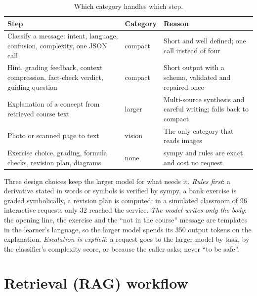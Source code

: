 \documentclass[11pt,a4paper]{article}
\begin{document}
\begin{table}[H]
\centering\small
\begin{tabularx}{\textwidth}{@{}p{5.6cm}p{2.3cm}Y@{}}
\toprule
\textbf{Step} & \textbf{Category} & \textbf{Reason} \\
\midrule
Classify a message: intent, language, confusion, complexity, one JSON call & compact & Short and well defined; one call instead of four \\
Hint, grading feedback, context compression, fact-check verdict, guiding question & compact & Short output with a schema, validated and repaired once \\
Explanation of a concept from retrieved course text & larger & Multi-source synthesis and careful writing; falls back to compact \\
Photo or scanned page to text & vision & The only category that reads images \\
Exercise choice, grading, formula checks, revision plan, diagrams & none & sympy and rules are exact and cost no request \\
\bottomrule
\end{tabularx}
\caption{Which category handles which step.}\label{tab:routing}
\end{table}
\vspace{-6pt}

Three design choices keep the larger model for what needs it. \emph{Rules first}: a derivative stated in words or
symbols is verified by sympy, a bank exercise is graded symbolically, a revision plan is computed; in a simulated
classroom of 96 interactive requests only 32 reached the service. \emph{The model writes only the body}: the opening
line, the exercise and the ``not in the course'' message are templates in the learner's language, so the larger model
spends its 350 output tokens on the explanation. \emph{Escalation is explicit}: a request goes to the larger model by
task, by the classifier's complexity score, or because the caller asks; never ``to be safe''.

\section{Retrieval (RAG) workflow}
\end{document}
